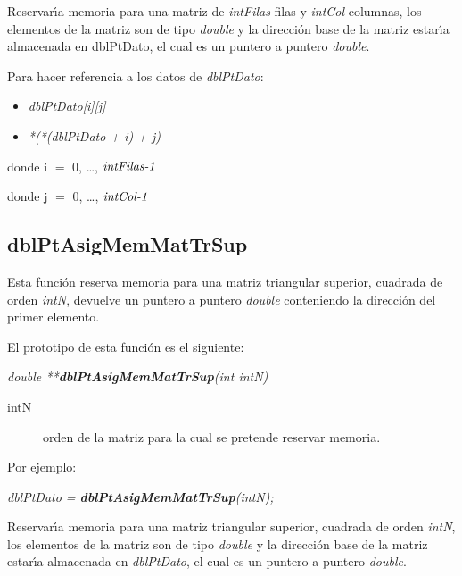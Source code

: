 Reservar\'{\i}a memoria para una matriz de \emph{intFilas} filas y 
\emph{intCol} columnas, los elementos de la matriz son de tipo
\emph{double} y la direcci\'on base de la matriz estar\'{\i}a almacenada
en dblPtDato, el cual es un puntero a puntero \emph{double}.

Para hacer referencia a los datos de \emph{dblPtDato}:

\begin{itemize}
\item \emph{dblPtDato[i][j]}
\item \emph{*(*(dblPtDato + i) + j)}
\end{itemize}

donde i $=$ 0, \ldots, $\emph{intFilas-1}$\newline

donde j $=$ 0, \ldots, $\emph{intCol-1}$

\newpage

\subsection{dblPtAsigMemMatTrSup}
Esta funci\'on reserva memoria para una matriz triangular superior, cuadrada
de orden \emph{intN}, devuelve un puntero a puntero \emph{double} conteniendo
la direcci\'on del primer elemento.\newline

El prototipo de esta funci\'on es el siguiente:

\begin{center}
\emph{double **\textbf{dblPtAsigMemMatTrSup}(int intN)}
\end{center}

\begin{description}
\item[intN] orden de la matriz para la cual se pretende reservar memoria.
\end{description}

Por ejemplo:

\begin{center}
\emph{dblPtDato = \textbf{dblPtAsigMemMatTrSup}(intN);}
\end{center}

Reservar\'{\i}a memoria para una matriz triangular superior, cuadrada de 
orden \emph{intN}, los elementos de la matriz son de tipo \emph{double} y
la direcci\'on base de la matriz estar\'{\i}a almacenada en \emph{dblPtDato}, 
el cual es un puntero a puntero \emph{double}.\newline

